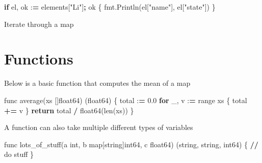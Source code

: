 \documentclass[]{book}
\newenvironment{Shaded}{\begin{snugshade}}{\end{snugshade}}
\newcommand{\BuiltInTok}[1]{#1}
\newcommand{\CharTok}[1]{\textcolor[rgb]{0.31,0.60,0.02}{#1}}
\newcommand{\ControlFlowTok}[1]{\textcolor[rgb]{0.13,0.29,0.53}{\textbf{#1}}}
\newcommand{\FloatTok}[1]{\textcolor[rgb]{0.00,0.00,0.81}{#1}}
\newcommand{\NormalTok}[1]{#1}
\newcommand{\OperatorTok}[1]{\textcolor[rgb]{0.81,0.36,0.00}{\textbf{#1}}}
\newcommand{\SpecialCharTok}[1]{\textcolor[rgb]{0.00,0.00,0.00}{#1}}
\newcommand{\StringTok}[1]{\textcolor[rgb]{0.31,0.60,0.02}{#1}}
\begin{document}
\begin{Shaded}
\begin{Highlighting}[]
\ControlFlowTok{if}\NormalTok{ el, ok :}\OperatorTok{=}\NormalTok{ elements[}\StringTok{"Li"}\NormalTok{]}\OperatorTok{;}\NormalTok{ ok \{}
\NormalTok{fmt.Println(el[}\StringTok{"name"}\NormalTok{], el[}\StringTok{"state"}\NormalTok{])}
\NormalTok{\}}
\end{Highlighting}
\end{Shaded}

Iterate through a map

\begin{Shaded}
\end{Shaded}

\hypertarget{functions}{%
\section{Functions}\label{functions}}

Below is a basic function that computes the mean of a map

\begin{Shaded}
\begin{Highlighting}[]
\NormalTok{func average(xs []float64) (float64) \{}
\NormalTok{    total :}\OperatorTok{=} \FloatTok{0.0}                      
    \ControlFlowTok{for}\NormalTok{ _, v :}\OperatorTok{=} \BuiltInTok{range}\NormalTok{ xs \{            }
\NormalTok{        total }\OperatorTok{+=}\NormalTok{ v                    }
\NormalTok{    \}}
    \ControlFlowTok{return}\NormalTok{ total }\OperatorTok{/}\NormalTok{ float64(}\BuiltInTok{len}\NormalTok{(xs))   }
\NormalTok{\}                                     }
\end{Highlighting}
\end{Shaded}

A function can also take multiple different types of variables

\begin{Shaded}
\begin{Highlighting}[]
\NormalTok{func lots_of_stuff(a }\BuiltInTok{int}\NormalTok{, b }\BuiltInTok{map}\NormalTok{[string]int64, c float64) (string, string, int64) \{}
\OperatorTok{//}\NormalTok{ do stuff}
\NormalTok{\}}
\end{Highlighting}
\end{Shaded}
\end{document}
